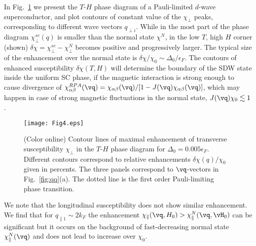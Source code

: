 \documentclass[aps,prl,twocolumn,showpacs,amsmath,amssymb]{revtex4-1}
\begin{document}
In Fig.~\ref{fig:ph.d} we present the $T$-$H$ phase diagram 
of a Pauli-limited $d$-wave superconductor, and plot contours of constant value 
of the $\chi_\perp$ peaks, corresponding to different wave vectors $q_{\perp i}$. 
While in the most part of the phase diagram $\chi^{sc}_\perp(q)$ is smaller than 
the normal state $\chi^N$, 
in the low $T$, high $H$ corner (shown) $\delta \chi = \chi_\perp^{sc} - \chi_\perp^{N}$ 
becomes positive and progressively larger. 
The typical size of the enhancement over the normal state is 
$\delta\chi/\chi_0 \sim \Delta_0/\epsilon_F$. 
The contours of enhanced susceptibility 
$\delta\chi(T,H)$ will determine the boundary of the SDW 
state inside the uniform SC phase, if the magnetic interaction is strong 
enough to cause divergence of 
$\chi^{RPA}_{\alpha\beta}(\vq)={\chi_{\alpha\beta} (\vq) }/{[1-J(\vq) \chi_{\alpha\beta}(\vq)]}$, 
which may happen in case of strong magnetic fluctuations in the normal state, 
$J(\vq) \chi_0 \lesssim 1$. 

\begin{figure}[t]
\texttt{[image: Fig4.eps]}
\caption{ 
	\label{fig:ph.d} 
(Color online) 
Contour lines of maximal enhancement of transverse susceptibility $\chi_\perp$ in the $T$-$H$ 
phase diagram for $\Delta_0 = 0.005\epsilon_F$. Different contours correspond to relative enhancements 
$\delta\chi(q)/\chi_0$ given in percents. 
The three panels correspond to $\vq$-vectors in Fig.~\ref{fig:qq}(a). 
The dotted line is the first order Pauli-limiting phase transition. 
}
\end{figure}
 
We note that the longitudinal susceptibility does not show similar enhancement. 
We find that for $q_{\parallel 1} \sim 2 k_F$ the enhancement 
$\chi_{\parallel}(\vq,H_0) > \chi^N_\parallel(\vq,\vH_0)$ can be 
significant but it occurs on the 
background of fast-decreasing normal state $\chi_\parallel^N(\vq)$ and does not lead to 
increase over $\chi_0$. 
\end{document}
